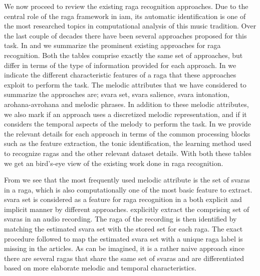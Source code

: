 {We now proceed to review the existing \gls{raga} recognition approaches. Due to the central role of the \gls{raga} framework in \gls{iam}, its automatic identification is one of the most researched topics in computational analysis of this music tradition. Over the last couple of decades there have been several approaches proposed for this task. In  and  we summarize the prominent existing approaches for \gls{raga} recognition. Both the tables comprise exactly the same set of approaches, but differ in terms of the type of information provided for each approach. In  we indicate the different characteristic features of a \gls{raga} that these approaches exploit to perform the task. The melodic attributes that we have considered to summarize the approaches are; \gls{svara} set, \gls{svara} salience, \gls{svara} intonation, \gls{arohana}-\gls{avrohana} and melodic phrases. In addition to these melodic attributes, we also mark if an approach uses a discretized melodic representation, and if it considers the temporal aspects of the melody to perform the task. In  we provide the relevant details for each approach in terms of the common processing blocks such as the feature extraction, the tonic identification, the learning method used to recognize \glspl{raga} and the other relevant dataset details. With both these tables we get an bird's-eye view of the existing work done in \gls{raga} recognition.

From  we see that the most frequently used melodic attribute is the set of \glspl{svara} in a \gls{raga}, which is also computationally one of the most basic feature to extract. \Gls{svara} set is considered as a feature for \gls{raga} recognition in a both explicit and implicit manner by different approaches. \citep{chakraborty2012object,ranjani2011carnatic} explicitly extract the comprising set of \glspl{svara} in an audio recording. The \gls{raga} of the recording is then identified by matching the estimated \gls{svara} set with the stored set for each \gls{raga}. The exact procedure followed to map the estimated \gls{svara} set with a unique \gls{raga} label is missing in the articles. As can be imagined, it is a rather naive approach since there are several \glspl{raga} that share the same set of \glspl{svara} and are differentiated based on more elaborate melodic and temporal characteristics.

}

